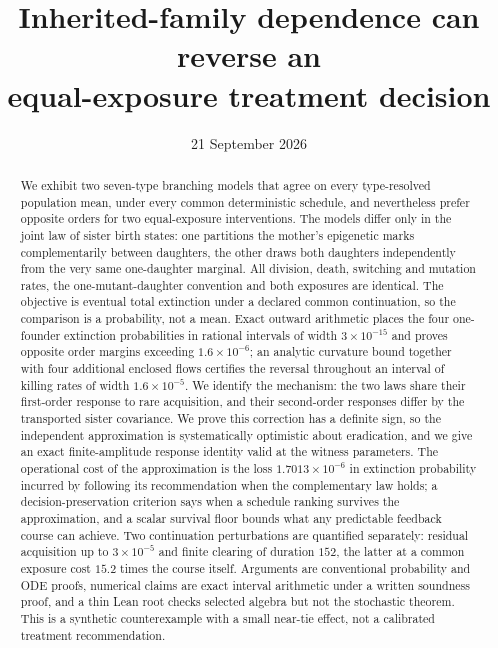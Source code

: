 \documentclass[11pt]{article}
\title{Inherited-family dependence can reverse an\\ equal-exposure treatment decision}
\author{}
\date{21 September 2026}
\theoremstyle{remark}
\begin{document}
\maketitle

\begin{abstract}
We exhibit two seven-type branching models that agree on every type-resolved
population mean, under every common deterministic schedule, and nevertheless
prefer opposite orders for two equal-exposure interventions. The models differ
only in the joint law of sister birth states: one partitions the mother's
epigenetic marks complementarily between daughters, the other draws both
daughters independently from the very same one-daughter marginal. All division,
death, switching and mutation rates, the one-mutant-daughter convention and
both exposures are identical. The objective is eventual total extinction under
a declared common continuation, so the comparison is a probability, not a mean.
Exact outward arithmetic places the four one-founder extinction probabilities in
rational intervals of width $3\times10^{-15}$ and proves opposite order margins
exceeding $1.6\times10^{-6}$; an analytic curvature bound together with four
additional enclosed flows certifies the reversal throughout an interval of
killing rates of width $1.6\times10^{-5}$. We identify the mechanism: the two
laws share their first-order response to rare acquisition, and their second-order
responses differ by the transported sister covariance. We prove this correction
has a definite sign, so the independent approximation is systematically
optimistic about eradication, and we give an exact finite-amplitude response
identity valid at the witness parameters. The operational cost of the
approximation is the loss $1.7013\times10^{-6}$ in extinction probability
incurred by following its recommendation when the complementary law holds; a
decision-preservation criterion says when a schedule ranking survives the
approximation, and a scalar survival floor bounds what any predictable feedback
course can achieve. Two continuation perturbations are quantified separately:
residual acquisition up to $3\times10^{-5}$ and finite clearing of duration
$152$, the latter at a common exposure cost $15.2$ times the course itself.
Arguments are conventional probability and ODE proofs, numerical claims are
exact interval arithmetic under a written soundness proof, and a thin Lean root
checks selected algebra but not the stochastic theorem. This is a synthetic
counterexample with a small near-tie effect, not a calibrated treatment
recommendation.
\end{abstract}
\end{document}
